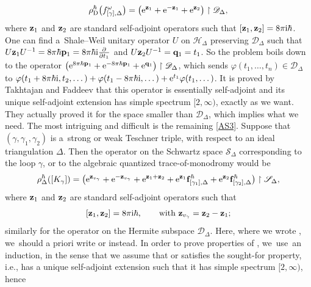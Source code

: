 \documentclass[10pt,a4paper]{amsart}
\numberwithin{equation}{section}
\theoremstyle{definition}
\begin{document}
\[
\rho^\hbar_{\rm D}\bigl(f^\omega_{[\gamma],\Delta}\bigr) = \bigl({\rm e}^{{\bf z}_1} + {\rm e}^{-{\bf z}_1} + {\rm e}^{{\bf z}_2} \bigr)\restriction \mathscr{D}_\Delta,
\]
where ${\bf z}_1$ and ${\bf z}_2$ are standard self-adjoint operators such that $[{\bf z}_1, {\bf z}_2] = 8 \pi {\rm i} \hbar$. One can find a~Shale--Weil unitary operator $U$ on $\mathscr{H}_\Delta$ preserving $\mathscr{D}_\Delta$ such that $U {\bf z}_1 U^{-1} = 8 \pi \hbar {\bf p}_1 = 8 \pi \hbar {\rm i} \frac{\partial}{\partial t_1}$ and $U {\bf z}_2 U^{-1} = {\bf q}_1 = t_1$. So the problem boils down to the operator $\bigl({\rm e}^{8\pi \hbar {\bf p}_1} + {\rm e}^{-8\pi \hbar {\bf p}_1} + {\rm e}^{{\bf q}_1}\bigr)\restriction \mathscr{D}_\Delta$, which sends $\varphi(t_1,\dots,t_n) \in \mathscr{D}_\Delta$ to $\varphi(t_1 + 8\pi \hbar {\rm i}, t_2,\dots) + \varphi(t_1 - 8\pi \hbar {\rm i}, \dots) + {\rm e}^{t_1} \varphi(t_1,\dots)$. It is proved by Takhtajan and Faddeev \cite{FT} that this operator is essentially self-adjoint and its unique self-adjoint extension has simple spectrum $[2,\infty)$, exactly as we want. They actually proved it for the space smaller than $\mathscr{D}_\Delta$, which implies what we need.
The most intriguing and difficult is the remaining \ref{AS3}. Suppose that $(\gamma,\gamma_1,\gamma_2)$ is a~strong or weak Teschner triple, with respect to an ideal triangulation $\Delta$. Then the operator on the Schwartz space $\mathscr{S}_\Delta$ corresponding to the loop $\gamma$, or to the algebraic quantized trace-of-monodromy would be
\begin{align*}
\rho^\hbar_\Delta([K_\gamma]) = \bigl( {\rm e}^{{\bf z}_{v_\gamma}} + {\rm e}^{-{\bf z}_{v_\gamma}} + {\rm e}^{{\bf z}_1 + {\bf z}_2} + {\rm e}^{{\bf z}_1} {\bf f}^\hbar_{[\gamma_1],\Delta} + {\rm e}^{{\bf z}_2} {\bf f}^\hbar_{[\gamma_2],\Delta}\bigr) \restriction \mathscr{S}_\Delta,
\end{align*}
where ${\bf z}_1$ and ${\bf z}_2$ are standard self-adjoint operators such that
\[
[{\bf z}_1,{\bf z}_2]=8\pi {\rm i} \hbar, \qquad \text{with ${\bf z}_{v_\gamma} = {\bf z}_2 - {\bf z}_1$};
\]
 similarly for the operator  on the Hermite subspace $\mathscr{D}_\Delta$. Here, where we wrote , we~should a priori write \smash{$\rho^\hbar_\Delta([K_{\gamma_j}])$} or  instead. In order to prove properties of , we~use~an induction, in the sense that we assume that \smash{$\rho^\hbar_\Delta([K_{\gamma_j}])$} or  satisfies the sought-for property, i.e., has a unique self-adjoint extension  such that it has simple spectrum $[2,\infty)$, hence
\end{document}
